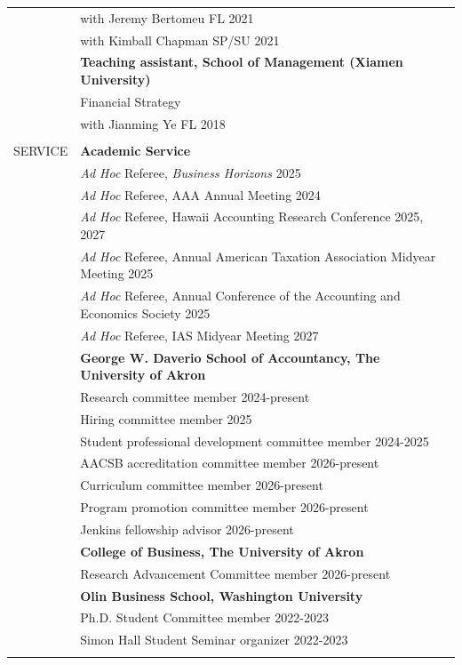 \documentclass[letterpaper, 11pt]{article}
\begin{document}
\begin{longtable}{p{1.15in}p{5.05in}}
& \hspace{3mm} with Jeremy Bertomeu  \hfill FL 2021\\
& \hspace{3mm} with Kimball Chapman  \hfill SP/SU 2021\\
& \textbf{Teaching assistant, School of Management (Xiamen University)} \\
& Financial Strategy \\
& \hspace{3mm} with Jianming Ye \hfill FL 2018\\
& \\


\textcolor{internationalkleinblue}{SERVICE} & \textbf{Academic Service} \\
& \textit{Ad Hoc} Referee, \textit{Business Horizons} \hfill 2025 \\
& \textit{Ad Hoc} Referee, AAA Annual Meeting \hfill 2024 \\
& \textit{Ad Hoc} Referee, Hawaii Accounting Research Conference \hfill 2025, 2027 \\
& \textit{Ad Hoc} Referee, Annual American Taxation Association Midyear Meeting \hfill 2025 \\
& \textit{Ad Hoc} Referee, Annual Conference of the Accounting and Economics Society \hfill 2025 \\
& \textit{Ad Hoc} Referee, IAS Midyear Meeting \hfill 2027 \\
& \textbf{George W. Daverio School of Accountancy, The University of Akron} \\
& Research committee member \hfill 2024-present \\
& Hiring committee member \hfill 2025 \\
& Student professional development committee member \hfill 2024-2025 \\
& AACSB accreditation committee member \hfill 2026-present \\
& Curriculum committee member \hfill 2026-present \\
& Program promotion committee member \hfill 2026-present \\
& Jenkins fellowship advisor \hfill 2026-present \\
& \textbf{College of Business, The University of Akron} \\
& Research Advancement Committee member \hfill 2026-present \\
& \textbf{Olin Business School, Washington University} \\
& Ph.D. Student Committee member \hfill 2022-2023 \\
& Simon Hall Student Seminar organizer \hfill 2022-2023 \\
& \\


\end{longtable}
\end{document}

